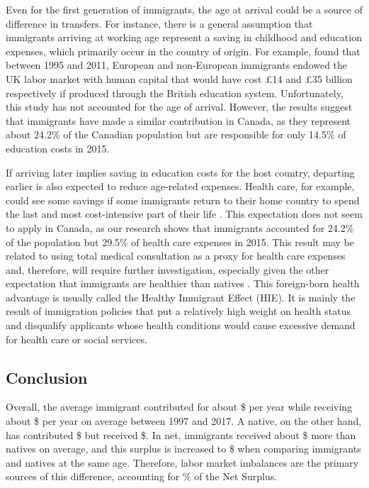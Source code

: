 \vspace{0.7em}\par
Even for the first generation of immigrants, the age at arrival could be a source of difference in transfers.
For instance, there is a general assumption that immigrants arriving at working age represent a saving in childhood and education expenses, which primarily occur in the country of origin.
For example, \citet{Dustmann:2014dr} found that between 1995 and 2011, European and non-European immigrants endowed the UK labor market with human capital that would have cost \pounds14 and \pounds35 billion respectively if produced through the British education system.
Unfortunately, this study has not accounted for the age of arrival.
However, the results suggest that immigrants have made a similar contribution in Canada, as they represent about 24.2\% of the Canadian population but are responsible for only 14.5\% of education costs in 2015.

\vspace{0.7em}\par
If arriving later implies saving in education costs for the host country, departing earlier is also expected to reduce age-related expenses.
Health care, for example, could see some savings if some immigrants return to their home country to spend the last and most cost-intensive part of their life \citep{Bratsberg:2014cl}.
This expectation does not seem to apply in Canada, as our research shows that immigrants accounted for 24.2\% of the population but 29.5\% of health care expenses in 2015. This result may be related to using total medical consultation as a proxy for health care expenses and, therefore, will require further investigation, especially given the other expectation that immigrants are healthier than natives \citep{ichouHealthyImmigrantEffect2019,vangAreImmigrantsHealthier2016}.
This foreign-born health advantage is usually called the Healthy Immigrant Effect (HIE). It is mainly the result of immigration policies that put a relatively high weight on health status and disqualify applicants whose health conditions would cause excessive demand for health care or social services.

\subsection{Conclusion}

Overall, the average immigrant contributed for about \$ per year while receiving about \$ per year on average between 1997 and 2017.
A native, on the other hand, has contributed \$ but received \$.
In net, immigrants received about \$ more than natives on average, and this surplus is increased to \$ when comparing immigrants and natives at the same age. Therefore, labor market imbalances are the primary sources of this difference, accounting for \% of the Net Surplus.


